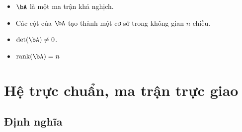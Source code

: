 


\begin{multicols}{2}
\begin{itemize}

    \item $\bA$ là một ma trận khả nghịch.

    \item Các cột của $\bA$ tạo thành một cơ sở trong không gian $n$ chiều.


    \item $\det(\bA) \neq 0$.

    \item $\rank(\bA) = n$
\end{itemize}
\end{multicols}







\section{Hệ trực chuẩn, ma trận trực giao}
\label{sec:linalg_orthogonality}
\subsection{Định nghĩa} %


